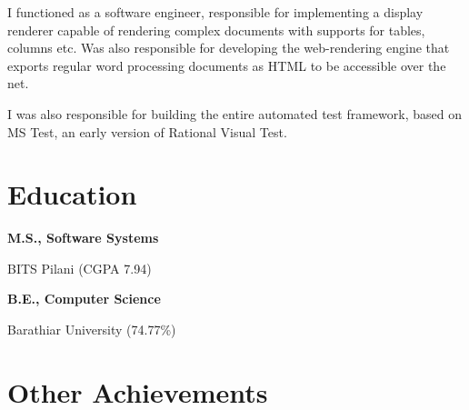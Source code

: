 \documentclass[a4paper,12pt]{article}
\newcommand\cveducation[4]{

  \normalfont\bf{#1, #2}

  \normalfont\small{#3 (#4)}
}
\begin{document}
I functioned as a software engineer, responsible for implementing a
display renderer capable of rendering complex documents with supports
for tables, columns etc. Was also responsible for developing the
web-rendering engine that exports regular word processing documents as
HTML to be accessible over the net.
 
I was also responsible for building the entire automated test
framework, based on MS Test, an early version of Rational Visual Test.

\section*{Education}

\cveducation{M.S.}{Software Systems}{BITS Pilani}{CGPA 7.94}
\cveducation{B.E.}{Computer Science}{Barathiar University}{74.77\%}

\section*{Other Achievements}

\lipsum
\end{document}
